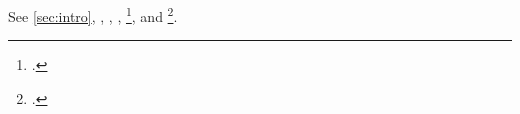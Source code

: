 \documentclass[twocolumn,unicode]{wrapper}
\begin{document}
\tableofcontents
\wrapperclass\articleclass\layoutmode\hyperdriver\hyperxmploaded\shimready

See \cref{sec:intro}, , \autocite{alpha}, \autocites[see][chap.~2]{alpha}[cf.][pp.~1--2]{beta}, \footcite{beta}, and \footcites{alpha}[cf.]{beta}.
\end{document}
